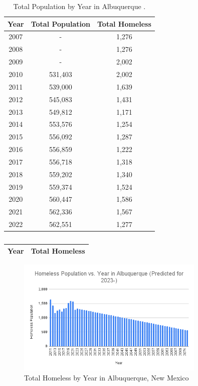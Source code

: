 \documentclass[12pt]{article}
\begin{document}
\begin{table}[H]
  \centering
  \begin{tabular}{|c c c|} 
    \hline 
    Year & Total Population & Total Homeless \\ [0.5ex]
    \hline
    2007 & -       & 1,276 \\
    2008 & -       & 1,276 \\
    2009 & -       & 2,002 \\
    2010 & 531,403 & 2,002 \\
    2011 & 539,000 & 1,639 \\
    2012 & 545,083 & 1,431 \\
    2013 & 549,812 & 1,171 \\
    2014 & 553,576 & 1,254 \\
    2015 & 556,092 & 1,287 \\
    2016 & 556,859 & 1,222 \\
    2017 & 556,718 & 1,318 \\
    2018 & 559,202 & 1,340 \\
    2019 & 559,374 & 1,524 \\
    2020 & 560,447 & 1,586 \\
    2021 & 562,336 & 1,567 \\
    2022 & 562,551 & 1,277 \\
    \hline
  \end{tabular}
  \caption{Total Population by Year in Albuquerque \cite{Census2022ACSST1Y2022.S0101,HOMELESS-STATS}.}
\end{table}

\begin{table}[H]
  \centering
  \begin{tabular}{|c c|} 
    \hline 
    Year & Total Homeless \\ [0.5ex]
    \hline
    
    \hline
  \end{tabular}
  \caption{}
\end{table}

\begin{figure}[H]
  \centering
  \includegraphics[width=0.8\textwidth]{homeless-vs-year-alb}
  \caption{Total Homeless by Year in Albuquerque, New Mexico}
\end{figure}
\end{document}
